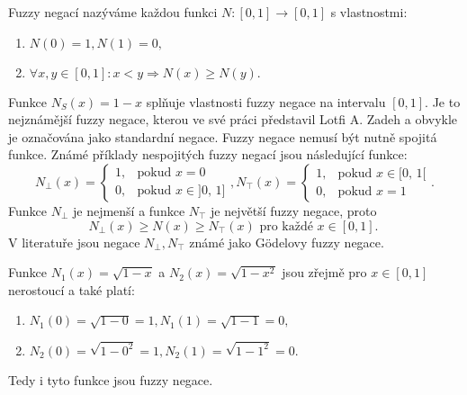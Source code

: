 \begin{definition}
\cite{Kolo} Fuzzy negací nazýváme každou funkci $N:[0, 1] \to [0, 1]$  s vlastnostmi:
    \begin{enumerate}
        \item  $N(0) = 1, N(1) = 0,$
        \item $\forall  x, y \in [0, 1]: x < y \Rightarrow{} N(x) \geq N(y).$
     \end{enumerate}
\end{definition}
     \begin{example}
         Funkce $N_S(x)=1-x$ spl\v nuje vlastnosti fuzzy negace na intervalu $[0,1].$ Je to nejzn\'am\v ej\v s\'i fuzzy negace, kterou ve sv\'e pr\'aci p\v redstavil Lotfi A. Zadeh a obvykle je ozna\v cov\'ana jako standardn\'i negace.   Fuzzy negace nemus\'i b\'yt nutn\v e spojit\'a funkce. Zn\'am\'e p\v r\'iklady nespojit\'ych fuzzy negac\'i jsou n\'asleduj\'ic\'i funkce:
         $$ N_{\bot}(x)=\begin{cases} 1, & \mbox{pokud }x=0 \\ 0, & 
         \mbox{pokud }x\in \mbox{]0, 1]} \end{cases}, 
         N_{\top}(x)=\begin{cases} 1, & \mbox{pokud }x\in \mbox{[0, 1[} \\ 0, & 
         \mbox{pokud }x=1 \end{cases}.$$
         Funkce $N_{\bot}$ je nejmen\v s\'i a funkce $N_{\top}$ je nejv\v et\v s\'i fuzzy negace, proto
         \begin{equation}
        N_{\bot}(x) \geq N(x) \geq N_\top(x)  \mbox{ pro každé } x \in [0, 1]. \
    \end{equation}
    V literatu\v re jsou negace $N_\bot, N_\top$ zn\'am\'e jako Gödelovy fuzzy negace.
    
    Funkce $N_1(x) = \sqrt{1-x}$ a $N_2(x) = \sqrt{1-x^2}$ jsou zřejmě pro $ x \in [0,1]$ nerostoucí a tak\'e plat\'i:
        \begin{enumerate}
            \item $N_1(0) = \sqrt{1-0} = 1, 
                    N_1(1) = \sqrt{1-1} = 0, $
            \item $N_2(0) = \sqrt{1-0^2} = 1,
                    N_2(1) = \sqrt{1-1^2} = 0.$
        \end{enumerate}
         Tedy i tyto funkce jsou fuzzy negace.


\end{example}
